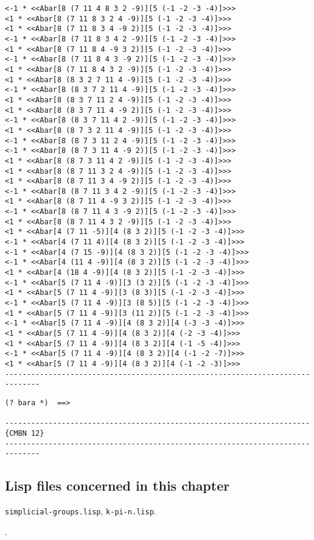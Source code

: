 {\begin{verbatim}
<-1 * <<Abar[8 (7 11 4 8 3 2 -9)][5 (-1 -2 -3 -4)]>>>
<1 * <<Abar[8 (7 11 8 3 2 4 -9)][5 (-1 -2 -3 -4)]>>>
<1 * <<Abar[8 (7 11 8 3 4 -9 2)][5 (-1 -2 -3 -4)]>>>
<-1 * <<Abar[8 (7 11 8 3 4 2 -9)][5 (-1 -2 -3 -4)]>>>
<1 * <<Abar[8 (7 11 8 4 -9 3 2)][5 (-1 -2 -3 -4)]>>>
<-1 * <<Abar[8 (7 11 8 4 3 -9 2)][5 (-1 -2 -3 -4)]>>>
<1 * <<Abar[8 (7 11 8 4 3 2 -9)][5 (-1 -2 -3 -4)]>>>
<1 * <<Abar[8 (8 3 2 7 11 4 -9)][5 (-1 -2 -3 -4)]>>>
<-1 * <<Abar[8 (8 3 7 2 11 4 -9)][5 (-1 -2 -3 -4)]>>>
<1 * <<Abar[8 (8 3 7 11 2 4 -9)][5 (-1 -2 -3 -4)]>>>
<1 * <<Abar[8 (8 3 7 11 4 -9 2)][5 (-1 -2 -3 -4)]>>>
<-1 * <<Abar[8 (8 3 7 11 4 2 -9)][5 (-1 -2 -3 -4)]>>>
<1 * <<Abar[8 (8 7 3 2 11 4 -9)][5 (-1 -2 -3 -4)]>>>
<-1 * <<Abar[8 (8 7 3 11 2 4 -9)][5 (-1 -2 -3 -4)]>>>
<-1 * <<Abar[8 (8 7 3 11 4 -9 2)][5 (-1 -2 -3 -4)]>>>
<1 * <<Abar[8 (8 7 3 11 4 2 -9)][5 (-1 -2 -3 -4)]>>>
<1 * <<Abar[8 (8 7 11 3 2 4 -9)][5 (-1 -2 -3 -4)]>>>
<1 * <<Abar[8 (8 7 11 3 4 -9 2)][5 (-1 -2 -3 -4)]>>>
<-1 * <<Abar[8 (8 7 11 3 4 2 -9)][5 (-1 -2 -3 -4)]>>>
<1 * <<Abar[8 (8 7 11 4 -9 3 2)][5 (-1 -2 -3 -4)]>>>
<-1 * <<Abar[8 (8 7 11 4 3 -9 2)][5 (-1 -2 -3 -4)]>>>
<1 * <<Abar[8 (8 7 11 4 3 2 -9)][5 (-1 -2 -3 -4)]>>>
<1 * <<Abar[4 (7 11 -5)][4 (8 3 2)][5 (-1 -2 -3 -4)]>>>
<-1 * <<Abar[4 (7 11 4)][4 (8 3 2)][5 (-1 -2 -3 -4)]>>>
<-1 * <<Abar[4 (7 15 -9)][4 (8 3 2)][5 (-1 -2 -3 -4)]>>>
<-1 * <<Abar[4 (11 4 -9)][4 (8 3 2)][5 (-1 -2 -3 -4)]>>>
<1 * <<Abar[4 (18 4 -9)][4 (8 3 2)][5 (-1 -2 -3 -4)]>>>
<-1 * <<Abar[5 (7 11 4 -9)][3 (3 2)][5 (-1 -2 -3 -4)]>>>
<1 * <<Abar[5 (7 11 4 -9)][3 (8 3)][5 (-1 -2 -3 -4)]>>>
<-1 * <<Abar[5 (7 11 4 -9)][3 (8 5)][5 (-1 -2 -3 -4)]>>>
<1 * <<Abar[5 (7 11 4 -9)][3 (11 2)][5 (-1 -2 -3 -4)]>>>
<-1 * <<Abar[5 (7 11 4 -9)][4 (8 3 2)][4 (-3 -3 -4)]>>>
<1 * <<Abar[5 (7 11 4 -9)][4 (8 3 2)][4 (-2 -3 -4)]>>>
<1 * <<Abar[5 (7 11 4 -9)][4 (8 3 2)][4 (-1 -5 -4)]>>>
<-1 * <<Abar[5 (7 11 4 -9)][4 (8 3 2)][4 (-1 -2 -7)]>>>
<1 * <<Abar[5 (7 11 4 -9)][4 (8 3 2)][4 (-1 -2 -3)]>>>
------------------------------------------------------------------------------
\end{verbatim}}
\newpage
{\footnotesize\begin{verbatim}
(? bara *)  ==>

----------------------------------------------------------------------{CMBN 12}
------------------------------------------------------------------------------
\end{verbatim}}

\subsection* {Lisp files concerned in this chapter}

{\tt simplicial-groups.lisp}, {\tt k-pi-n.lisp}.
\par
[{\tt classes.lisp }, {\tt macros.lisp}, {\tt various.lisp}].
